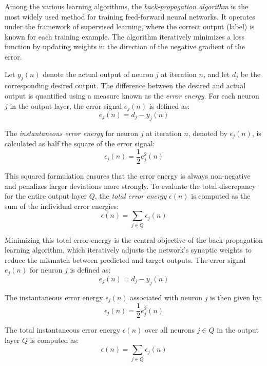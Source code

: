 Among the various learning algorithms, the \textit{back-propagation algorithm} is the most widely used method for training feed-forward neural networks. It operates under the framework of supervised learning, where the correct output (label) is known for each training example. The algorithm iteratively minimizes a loss function by updating weights in the direction of the negative gradient of the error.

Let $y_j(n)$ denote the actual output of neuron $j$ at iteration $n$, and let $d_j$ be the corresponding desired output. The difference between the desired and actual output is quantified using a measure known as the \textit{error energy}. For each neuron \( j \) in the output layer, the error signal \( e_j(n) \) is defined as:
\begin{equation}
    e_j(n) = d_j - y_j(n)
\end{equation}

The \textit{instantaneous error energy} for neuron \( j \) at iteration \( n \), denoted by \( \epsilon_j(n) \), is calculated as half the square of the error signal:
\begin{equation}
    \epsilon_j(n) = \frac{1}{2} e_j^2(n)
\end{equation}

This squared formulation ensures that the error energy is always non-negative and penalizes larger deviations more strongly. To evaluate the total discrepancy for the entire output layer \( Q \), the \textit{total error energy} \( \epsilon(n) \) is computed as the sum of the individual error energies:
\begin{equation}
    \epsilon(n) = \sum_{j \in Q} \epsilon_j(n)
\end{equation}

Minimizing this total error energy is the central objective of the back-propagation learning algorithm, which iteratively adjusts the network’s synaptic weights to reduce the mismatch between predicted and target outputs. The error signal $e_j(n)$ for neuron $j$ is defined as:
\begin{equation}
    e_j(n) = d_j - y_j(n)
\end{equation}

The instantaneous error energy $\epsilon_j(n)$ associated with neuron $j$ is then given by:
\begin{equation}
    \epsilon_j(n) = \frac{1}{2} e_j^2(n)
\end{equation}

The total instantaneous error energy $\epsilon(n)$ over all neurons $j \in Q$ in the output layer $Q$ is computed as:
\begin{equation}
    \epsilon(n) = \sum_{j \in Q} \epsilon_j(n)
\end{equation}

